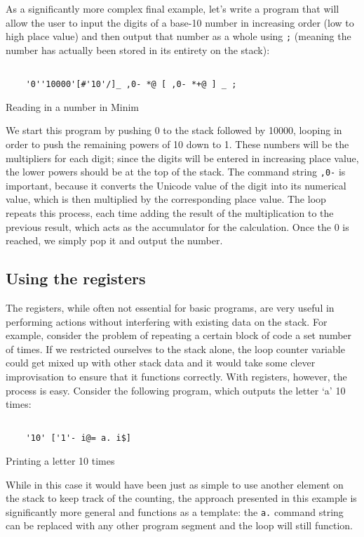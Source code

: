 \documentclass{article}
\begin{document}
As a significantly more complex final example, let's write a program that will allow the user to input the digits of a base-10 number in increasing order (low to high place value) and then output that number as a whole using \texttt{;} (meaning the number has actually been stored in its entirety on the stack):
\begin{program}
	\begin{verbatim}
	
	'0''10000'[#'10'/]_ ,0- *@ [ ,0- *+@ ] _ ;
	\end{verbatim}
	\caption{Reading in a number in Minim}
\end{program}
We start this program by pushing 0 to the stack followed by 10000, looping in order to push the remaining powers of 10 down to 1. These numbers will be the multipliers for each digit; since the digits will be entered in increasing place value, the lower powers should be at the top of the stack. The command string \texttt{,0-} is important, because it converts the Unicode value of the digit into its numerical value, which is then multiplied by the corresponding place value. The loop repeats this process, each time adding the result of the multiplication to the previous result, which acts as the accumulator for the calculation. Once the 0 is reached, we simply pop it and output the number.
\subsection{Using the registers}
The registers, while often not essential for basic programs, are very useful in performing actions without interfering with existing data on the stack. For example, consider the problem of repeating a certain block of code a set number of times. If we restricted ourselves to the stack alone, the loop counter variable could get mixed up with other stack data and it would take some clever improvisation to ensure that it functions correctly. With registers, however, the process is easy. Consider the following program, which outputs the letter `a' 10 times:
\begin{program}
	\begin{verbatim}
	
	'10' ['1'- i@= a. i$]
	\end{verbatim}
	\caption{Printing a letter 10 times}
\end{program}
While in this case it would have been just as simple to use another element on the stack to keep track of the counting, the approach presented in this example is significantly more general and functions as a template: the \texttt{a.} command string can be replaced with any other program segment and the loop will still function.
\end{document}
